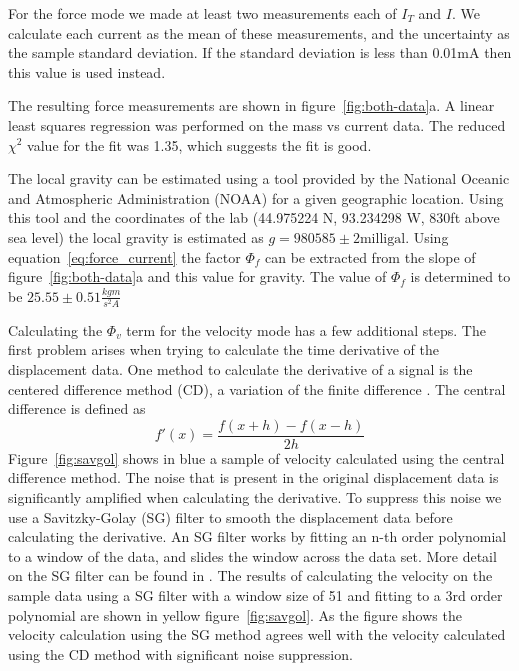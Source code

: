 \documentclass[aps,prstab,reprint,12pt]{revtex4-1}
\begin{document}
For the force mode we made at least two measurements each of $I_T$ and $I$. We calculate each current as the mean of these measurements, and the uncertainty as the sample standard deviation. If the standard deviation is less than 0.01mA then this value is used instead.

The resulting force measurements are shown in figure~\ref{fig:both-data}a. A linear least squares regression was performed on the mass vs current data. The reduced $\chi^2$ value for the fit was 1.35, which suggests the fit is good.

The local gravity can be estimated using a tool provided by the National Oceanic and Atmospheric Administration (NOAA) for a given geographic location. Using this tool and the coordinates of the lab (44.975224 N, 93.234298 W, 830ft above sea level) the local gravity is estimated as $g=980585\pm2\mathrm{milligal}$. Using equation~\ref{eq:force_current} the factor $\Phi_f$ can be extracted from the slope of figure~\ref{fig:both-data}a and this value for gravity. The value of $\Phi_f$ is determined to be $25.55 \pm 0.51\si{\frac{kgm}{s^2A}}$


Calculating the $\Phi_v$ term for the velocity mode has a few additional steps. The first problem arises when trying to calculate the time derivative of the displacement data. One method to calculate the derivative of a signal is the centered difference method (CD), a variation of the finite difference \cite{finite_diff}.
The central difference is defined as
\begin{equation}
    f'(x) = \frac{f(x+h)-f(x-h)}{2h}
    \label{eq:diff}
\end{equation}
Figure~\ref{fig:savgol} shows in blue a sample of velocity calculated using the central difference method.
The noise that is present in the original displacement data is significantly amplified when calculating the derivative.
To suppress this noise we use a Savitzky-Golay (SG) filter to smooth the displacement data before calculating the derivative.
An SG filter works by fitting an n-th order polynomial to a window of the data, and slides the window across the data set.
More detail on the SG filter can be found in \cite{press1990savitzky}.
The results of calculating the velocity on the sample data using a SG filter with a window size of 51 and fitting to a 3rd order polynomial are shown in yellow figure~\ref{fig:savgol}.
As the figure shows the velocity calculation using the SG method agrees well with the velocity calculated using the CD method with significant noise suppression.
\end{document}
